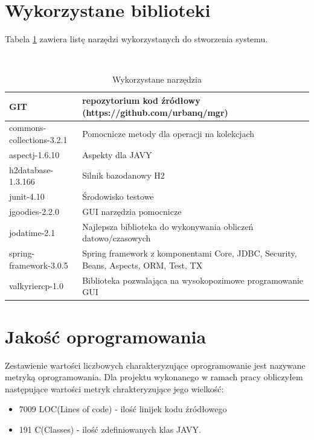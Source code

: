 \section{Wykorzystane biblioteki}
\label{sec:wykorzystaneBiblioteki}
Tabela \ref{tab:tools} zawiera listę narzędzi wykorzystanych do stworzenia systemu.
\begin{table}[h]
 \caption{Wykorzystane narzędzia}
 \small\tt
 \centering
 \vspace{0in}
 \begin{tabular}{|l|p{7cm}|}
 \hline
 GIT & repozytorium kod źródłowy (https://github.com/urbanq/mgr) \\
 \hline
 commons-collections-3.2.1 & Pomocnicze metody dla operacji na kolekcjach \\
 \hline
 aspectj-1.6.10 & Aspekty dla JAVY \\
 \hline
 h2database-1.3.166 & Silnik bazodanowy H2 \\
 \hline
 junit-4.10 & Środowisko testowe \\
 \hline
 jgoodies-2.2.0 & GUI narzędzia pomocnicze \\
 \hline
 jodatime-2.1 & Najlepsza biblioteka do wykonywania obliczeń datowo/czasowych \\
 \hline
 spring-framework-3.0.5 & Spring framework z komponentami Core, JDBC, Security, Beans, Aspects, ORM, Test, TX \\
 \hline
 valkyriercp-1.0 & Biblioteka pozwalająca na wysokopozimowe programowanie GUI \\
 \hline
 \end{tabular}
 \label{tab:tools}
\end{table}


\section{Jakość oprogramowania}
\label{sec:jakoscOprogramowania}

Zestawienie wartości liczbowych charakteryzujące oprogramowanie jest nazywane metryką oprogramowania. Dla projektu wykonanego w ramach pracy obliczyłem następujące wartości metryk chrakteryzujące jego wielkość:
\begin{itemize}
 \item 7009 LOC(Lines of code) - ilość linijek kodu źródłowego
 \item 191 C(Classes) - ilość zdefiniowanych klas JAVY.
\end{itemize}

